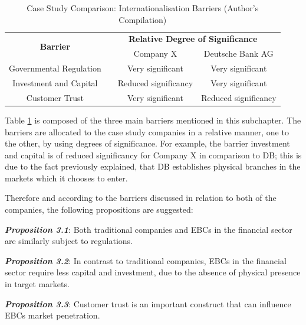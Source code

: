 \documentclass[11pt,a4paper]{article}
\begin{document}
{{{\vspace{8mm}
\begin{table}[H] \centering 
\begin{tabular}{c l c c}
    \toprule
    \multirow{2}{*}{\bfseries Barrier} & 
    \multicolumn{3}{c}{\bfseries Relative Degree of Significance}\\ \cmidrule(lr){3-4}
    && Company X&Deutsche Bank AG \\ \cmidrule(lr){1-4}
    Governmental Regulation&  & Very significant & Very significant \\
    Investment and Capital & & Reduced significancy  & Very significant\\
     Customer Trust &  & Very significant & Reduced significancy\\
    \bottomrule
\end{tabular}
\vspace{5mm}
\captionsetup{width=0.85\linewidth}
\caption{Case Study Comparison: Internationalisation Barriers (Author's Compilation)} 
\label{table:int_barriers_comp}
\end{table} 

Table \ref{table:int_barriers_comp} is composed of the three main barriers mentioned in this subchapter. The barriers are allocated to the case study companies in a relative manner, one to the other, by using degrees of significance. For example, the barrier investment and capital is of reduced significancy for Company X in comparison to DB; this is due to the fact previously explained, that DB establishes physical branches in the markets which it chooses to enter. \par
Therefore and according to the barriers discussed in relation to both of the companies, the following propositions are suggested:

\begin{center}
\textbf{\textit{Proposition 3.1}}: Both traditional companies and EBCs in the financial sector are similarly subject to regulations.
\end{center}
\begin{center}
\textbf{\textit{Proposition 3.2}}: In contrast to traditional companies, EBCs in the financial sector require less capital and investment, due to the absence of physical presence in target markets.
\end{center}
\begin{center}
\textbf{\textit{Proposition 3.3}}: Customer trust is an important construct that can influence EBCs market penetration.
\end{center}

}}}
\end{document}
